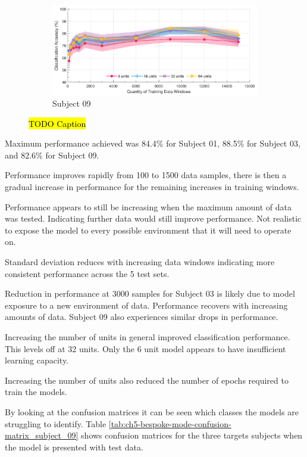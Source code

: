 \begin{figure}[p]
    \begin{subfigure}[b]{0.9\textwidth}
        \centering
        \includegraphics[width=\textwidth]{content/5-Personalisation/Bespoke_Target/ch5_bespoke_target_model_subject_9.pdf}
        \caption{Subject 09}
        \label{fig:ch5_32_unit_bespoke_model}
    \end{subfigure}
    \caption[TODO Caption]{\hl{TODO Caption}}
    \label{fig:ch5_bespoke_mode_classification}
\end{figure}

Maximum performance achieved was 84.4\% for Subject 01, 88.5\% for Subject 03, and 82.6\% for Subject 09.

Performance improves rapidly from 100 to 1500 data samples, there is then a gradual increase in performance for the remaining increases in training windows.

Performance appears to still be increasing when the maximum amount of data was tested. Indicating further data would still improve performance. Not realistic to expose the model to every possible environment that it will need to operate on.

Standard deviation reduces with increasing data windows indicating more consistent performance across the 5 test sets.

Reduction in performance at 3000 samples for Subject 03 is likely due to model exposure to a new environment of data. Performance recovers with increasing amounts of data. Subject 09 also experiences similar drops in performance.

Increasing the number of units in general improved classification performance. This levels off at 32 units. Only the 6 unit model appears to have insufficient learning capacity. 

Increasing the number of units also reduced the number of epochs required to train the models. 

By looking at the confusion matrices it can be seen which classes the models are struggling to identify. Table \ref{tab:ch5-bespoke-mode-confusion-matrix_subject_09} shows confusion matrices for the three targets subjects when the model is presented with test data.

